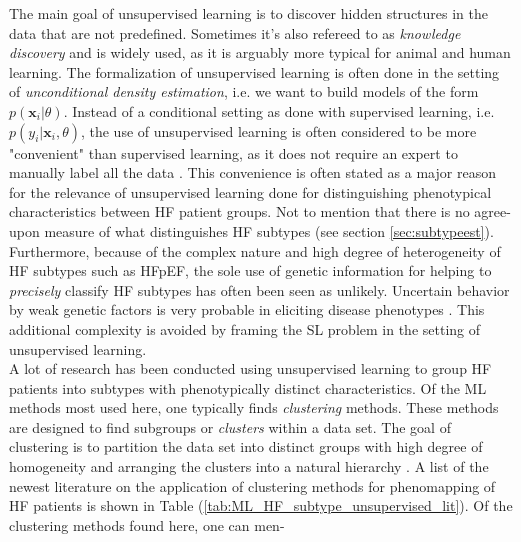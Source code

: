 \documentclass[../thesis.tex]{subfiles}
\begin{document}
\noindent The main goal of unsupervised learning is to discover hidden structures in the data that are not predefined. Sometimes it's also refereed to as \textit{knowledge discovery} and is widely used, as it is arguably more typical for animal and human learning. The formalization of unsupervised learning is often done in the setting of \textit{unconditional density estimation}, i.e. we want to build models of the form $p(\mathbf{x}_i | \theta)$. Instead of a conditional setting as done with supervised learning, i.e. $p(y_i | \mathbf{x}_i, \theta)$, the use of unsupervised learning is often considered to be more "convenient" than supervised learning, as it does not require an expert to manually label all the data \citep{muphy2012machine}. This convenience is often stated as a major reason for the relevance of unsupervised learning done for distinguishing phenotypical characteristics between HF patient groups. Not to mention that there is no agree-upon measure of what distinguishes HF subtypes (see section \ref{sec:subtypeest}). Furthermore, because of the complex nature and high degree of heterogeneity of HF subtypes such as HFpEF, the sole use of genetic information for helping to \textit{precisely} classify HF subtypes has often been seen as unlikely. Uncertain behavior by weak genetic factors is very probable in eliciting disease phenotypes \citep{deo2015machine}. This additional complexity is avoided by framing the SL problem in the setting of unsupervised learning.\\
\indent A lot of research has been conducted using unsupervised learning to group HF patients into subtypes with phenotypically distinct characteristics. Of the ML methods most used here, one typically finds \textit{clustering} methods. These methods are designed to find subgroups or \textit{clusters} within a data set. The goal of clustering is to partition the data set into distinct groups with high degree of homogeneity and arranging the clusters into a natural hierarchy \citep{friedman2009elements}. A list of the newest literature on the application of clustering methods for phenomapping of HF patients is shown in Table (\ref{tab:ML_HF_subtype_unsupervised_lit}). Of the clustering methods found here, one can men-


\end{document}
